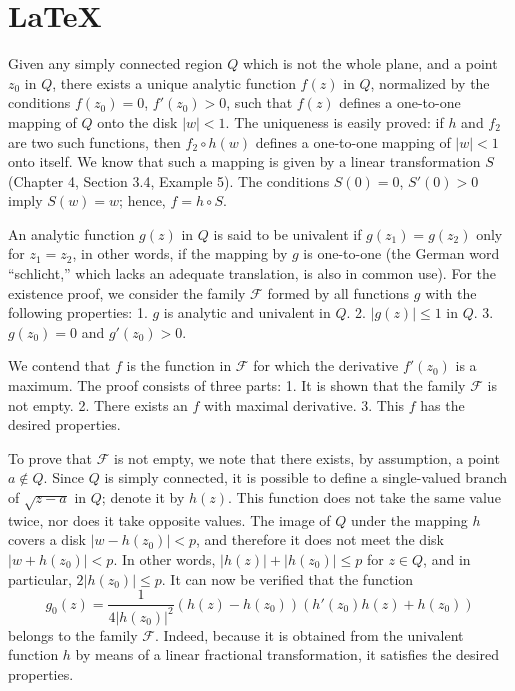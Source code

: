 \documentclass[
]{book}
\theoremstyle{definition}
\theoremstyle{definition}
\theoremstyle{definition}
\theoremstyle{definition}
\theoremstyle{remark}
\begin{document}
\section{LaTeX}\label{latex}

Given any simply connected region \(Q\) which is not the whole plane, and a point \(z_0\) in \(Q\), there exists a unique analytic function \(f(z)\) in \(Q\), normalized by the conditions \(f(z_0) = 0\), \(f'(z_0) > 0\), such that \(f(z)\) defines a one-to-one mapping of \(Q\) onto the disk \(|w| < 1\). The uniqueness is easily proved: if \(h\) and \(f_2\) are two such functions, then \(f_2 \circ h(w)\) defines a one-to-one mapping of \(|w| < 1\) onto itself. We know that such a mapping is given by a linear transformation \(S\) (Chapter 4, Section 3.4, Example 5). The conditions \(S(0) = 0\), \(S'(0) > 0\) imply \(S(w) = w\); hence, \(f = h \circ S\).

An analytic function \(g(z)\) in \(Q\) is said to be univalent if \(g(z_1) = g(z_2)\) only for \(z_1 = z_2\), in other words, if the mapping by \(g\) is one-to-one (the German word ``schlicht,'' which lacks an adequate translation, is also in common use). For the existence proof, we consider the family \(\mathcal{F}\) formed by all functions \(g\) with the following properties:
1. \(g\) is analytic and univalent in \(Q\).
2. \(|g(z)| \leq 1\) in \(Q\).
3. \(g(z_0) = 0\) and \(g'(z_0) > 0\).

We contend that \(f\) is the function in \(\mathcal{F}\) for which the derivative \(f'(z_0)\) is a maximum. The proof consists of three parts:
1. It is shown that the family \(\mathcal{F}\) is not empty.
2. There exists an \(f\) with maximal derivative.
3. This \(f\) has the desired properties.

To prove that \(\mathcal{F}\) is not empty, we note that there exists, by assumption, a point \(a \notin Q\). Since \(Q\) is simply connected, it is possible to define a single-valued branch of \(\sqrt{z - a}\) in \(Q\); denote it by \(h(z)\). This function does not take the same value twice, nor does it take opposite values. The image of \(Q\) under the mapping \(h\) covers a disk \(|w - h(z_0)| < p\), and therefore it does not meet the disk \(|w + h(z_0)| < p\). In other words, \(|h(z)| + |h(z_0)| \leq p\) for \(z \in Q\), and in particular, \(2|h(z_0)| \leq p\). It can now be verified that the function
\[ g_0(z) = \frac{1}{4|h(z_0)|^2} \left(h(z) - h(z_0)\right) \left(h'(z_0) h(z) + h(z_0)\right) \]
belongs to the family \(\mathcal{F}\). Indeed, because it is obtained from the univalent function \(h\) by means of a linear fractional transformation, it satisfies the desired properties.
\end{document}
